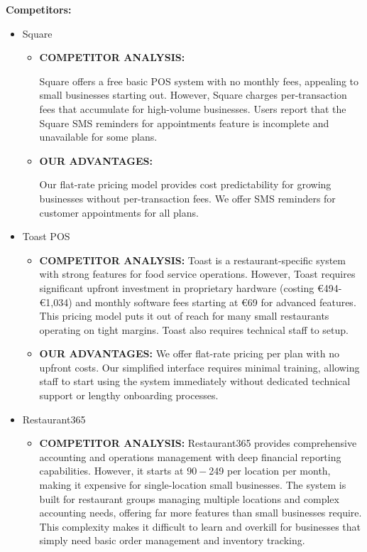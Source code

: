 \documentclass[]{VUMIFTemplateClass}
\begin{document}
\newpage
\textbf{Competitors:}

\begin{itemize}
    \item Square
\begin{itemize}
        \item \textbf{COMPETITOR ANALYSIS:}
        
        Square offers a free basic POS system with no monthly fees, appealing to
        small businesses starting out. However, Square charges per-transaction
        fees that accumulate for high-volume businesses. Users report that the Square SMS reminders for appointments feature is incomplete and unavailable for some plans.

        \item \textbf{OUR ADVANTAGES:} 
        
        Our flat-rate pricing model provides cost predictability for growing
        businesses without per-transaction fees. We offer SMS reminders for customer appointments for all plans.

    \end{itemize}
    

    \item {Toast POS}
    \begin{itemize}
        \item  \textbf{COMPETITOR ANALYSIS:}
        Toast is a restaurant-specific system with strong
        features for food service operations. However, Toast requires significant
        upfront investment in proprietary hardware (costing €494-€1,034) and monthly
        software fees starting at €69 for advanced features. This pricing model
        puts it out of reach for many small restaurants operating on tight margins.
        Toast also requires technical staff to setup.

        \item  \textbf{OUR ADVANTAGES:} 
        We offer flat-rate pricing per plan with no upfront costs. Our simplified interface
        requires minimal training, allowing staff to start using the system
        immediately without dedicated technical support or lengthy onboarding
        processes.
    \end{itemize}
    
    \item Restaurant365
    \begin{itemize}
        \item \textbf{COMPETITOR ANALYSIS:}
        Restaurant365 provides comprehensive
        accounting and operations management with deep financial reporting
        capabilities. However, it starts at $90-$249 per location per month, making
        it expensive for single-location small businesses. The system is built for
        restaurant groups managing multiple locations and complex accounting needs,
        offering far more features than small businesses require. This complexity
        makes it difficult to learn and overkill for businesses that simply need
        basic order management and inventory tracking.


\end{itemize}
\end{itemize}
\end{document}
